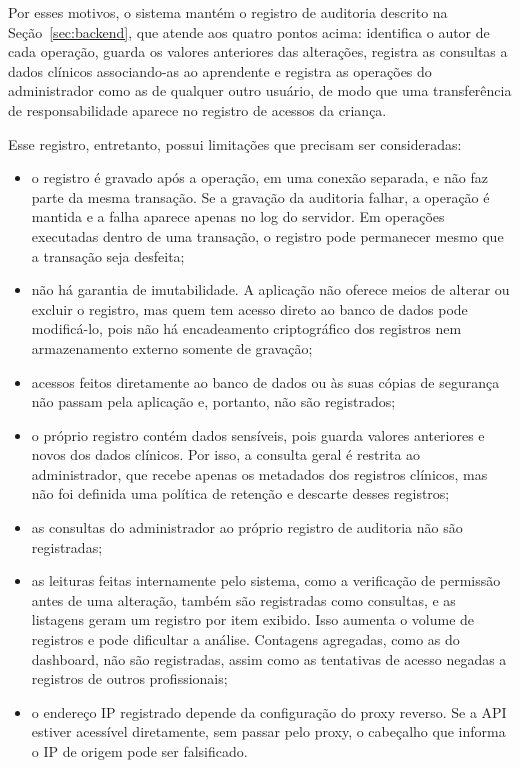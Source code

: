 Por esses motivos, o sistema mantém o registro de auditoria descrito na Seção~\ref{sec:backend}, que atende aos quatro pontos acima: identifica o autor de cada operação, guarda os valores anteriores das alterações, registra as consultas a dados clínicos associando-as ao aprendente e registra as operações do administrador como as de qualquer outro usuário, de modo que uma transferência de responsabilidade aparece no registro de acessos da criança.

Esse registro, entretanto, possui limitações que precisam ser consideradas:

\begin{itemize}
    \item o registro é gravado após a operação, em uma conexão separada, e não faz parte da mesma transação. Se a gravação da auditoria falhar, a operação é mantida e a falha aparece apenas no log do servidor. Em operações executadas dentro de uma transação, o registro pode permanecer mesmo que a transação seja desfeita;
    \item não há garantia de imutabilidade. A aplicação não oferece meios de alterar ou excluir o registro, mas quem tem acesso direto ao banco de dados pode modificá-lo, pois não há encadeamento criptográfico dos registros nem armazenamento externo somente de gravação;
    \item acessos feitos diretamente ao banco de dados ou às suas cópias de segurança não passam pela aplicação e, portanto, não são registrados;
    \item o próprio registro contém dados sensíveis, pois guarda valores anteriores e novos dos dados clínicos. Por isso, a consulta geral é restrita ao administrador, que recebe apenas os metadados dos registros clínicos, mas não foi definida uma política de retenção e descarte desses registros;
    \item as consultas do administrador ao próprio registro de auditoria não são registradas;
    \item as leituras feitas internamente pelo sistema, como a verificação de permissão antes de uma alteração, também são registradas como consultas, e as listagens geram um registro por item exibido. Isso aumenta o volume de registros e pode dificultar a análise. Contagens agregadas, como as do dashboard, não são registradas, assim como as tentativas de acesso negadas a registros de outros profissionais;
    \item o endereço IP registrado depende da configuração do proxy reverso. Se a API estiver acessível diretamente, sem passar pelo proxy, o cabeçalho que informa o IP de origem pode ser falsificado.
\end{itemize}

